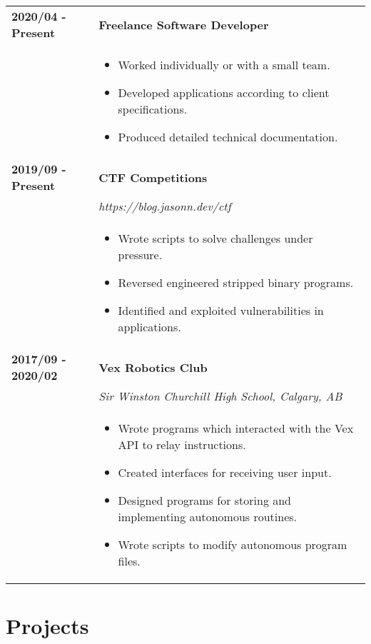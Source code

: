 \documentclass[letterpaper]{article}
\begin{document}
        \begin{tabular}{p{} p{}} 
            \textbf{2020/04 - Present} & \large\textbf{Freelance Software Developer} \\
            & \begin{itemize}
                \item Worked individually or with a small team.
                \item Developed applications according to client specifications.
                \item Produced detailed technical documentation.
            \end{itemize}
            \\
            \textbf{2019/09 - Present} & \large\textbf{CTF Competitions} \\
            & \emph{https://blog.jasonn.dev/ctf} \\
            & \begin{itemize}
                \item Wrote scripts to solve challenges under pressure.
                \item Reversed engineered stripped binary programs.
                \item Identified and exploited vulnerabilities in applications. 
            \end{itemize}
            \\
            \textbf{2017/09 - 2020/02} & \large\textbf{Vex Robotics Club} \\
            & \emph{Sir Winston Churchill High School, Calgary, AB} \\
            & \begin{itemize}
                \item Wrote programs which interacted with the Vex API to relay instructions.
                \item Created interfaces for receiving user input.
                \item Designed programs for storing and implementing autonomous routines.
                \item Wrote scripts to modify autonomous program files.
            \end{itemize}
        \end{tabular}

    \section*{Projects}
\end{document}
